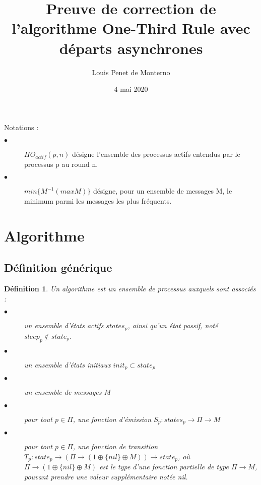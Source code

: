 \documentclass{article}
\title{Preuve de correction de l'algorithme One-Third Rule avec départs asynchrones}
\date{4 mai 2020}
\author{Louis Penet de Monterno}
\newtheorem{definition}{Définition}
\begin{document}
\maketitle
  
Notations :

\begin{description}

\item[$\bullet$] $HO_{actif}(p,n)$ désigne l'ensemble des processus actifs entendus par le processus p au round n.
\item[$\bullet$] $min \{M^{-1} (max M)\}$ désigne, pour un ensemble de messages M, le minimum parmi les messages les plus fréquents.
\end{description}

\section{Algorithme}

\subsection{Définition générique}

\begin{definition}

Un algorithme est un ensemble de processus auxquels sont associés :

\begin{description}

  \item[$\bullet$] un ensemble d'états actifs
	  $states_p$, ainsi qu'un état passif, noté $sleep_p \notin state_p$.
  \item[$\bullet$] un ensemble d'états initiaux  $init_p \subset state_p$
  \item[$\bullet$] un ensemble de messages M
  \item[$\bullet$] pour tout $p \in \Pi$, une fonction d'émission
	  $S_p : states_p \rightarrow \Pi \rightarrow M$
  \item[$\bullet$] pour tout $p \in \Pi$, une fonction de transition
	  $T_p : state_p \rightarrow (\Pi \rightarrow (1 \oplus \{ nil \} \oplus M))
	  \rightarrow state_p$,
	  où $\Pi \rightarrow (1 \oplus \{ nil \} \oplus M)$ est le type d'une fonction partielle
		de type $\Pi \rightarrow M$, pouvant prendre une valeur supplémentaire notée \textit{nil}.

\end{description}
\end{definition}
\end{document}
